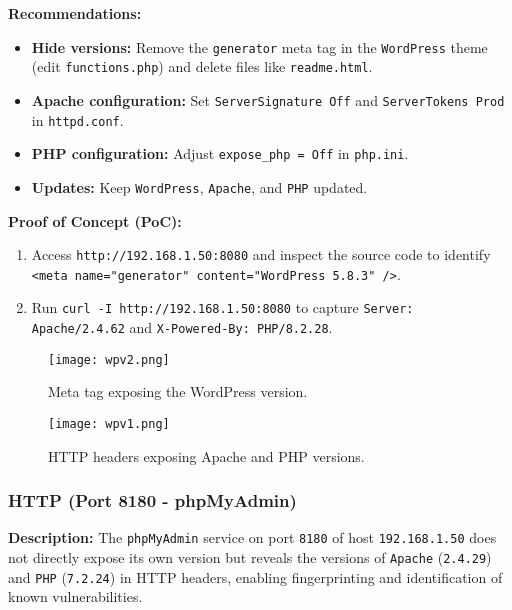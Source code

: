 \documentclass[a4paper,12pt]{article}
\begin{document}
\textbf{Recommendations:}  
\begin{itemize}
    \item \textbf{Hide versions:} Remove the \texttt{generator} meta tag in the \texttt{WordPress} theme (edit \texttt{functions.php}) and delete files like \texttt{readme.html}.  
    \item \textbf{Apache configuration:} Set \texttt{ServerSignature Off} and \texttt{ServerTokens Prod} in \texttt{httpd.conf}.  
    \item \textbf{PHP configuration:} Adjust \texttt{expose\_php = Off} in \texttt{php.ini}.  
    \item \textbf{Updates:} Keep \texttt{WordPress}, \texttt{Apache}, and \texttt{PHP} updated.  
\end{itemize}

\textbf{Proof of Concept (PoC):}  
\begin{enumerate}
    \item Access \texttt{http://192.168.1.50:8080} and inspect the source code to identify \texttt{<meta name="generator" content="WordPress 5.8.3" />}.  
    \item Run \texttt{curl -I http://192.168.1.50:8080} to capture \texttt{Server: Apache/2.4.62} and \texttt{X-Powered-By: PHP/8.2.28}.  
\end{enumerate}

\begin{figure}[ht]
    \centering
    \texttt{[image: wpv2.png]}
    \caption{Meta tag exposing the WordPress version.}
\end{figure}

\begin{figure}[H]
    \centering
    \texttt{[image: wpv1.png]}
    \caption{HTTP headers exposing Apache and PHP versions.}
\end{figure}

\clearpage

\subsubsection{HTTP (Port 8180 - phpMyAdmin)}
\textbf{Description:}  
The \texttt{phpMyAdmin} service on port \texttt{8180} of host \texttt{192.168.1.50} does not directly expose its own version but reveals the versions of \texttt{Apache} (\texttt{2.4.29}) and \texttt{PHP} (\texttt{7.2.24}) in HTTP headers, enabling fingerprinting and identification of known vulnerabilities.
\end{document}
